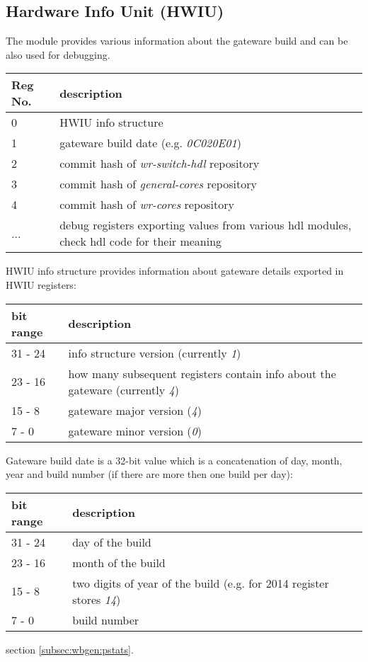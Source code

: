 \subsection{Hardware Info Unit (HWIU)}
\label{sec:hwiu}

The module provides various information about the gateware build and can be also
used for debugging.

\begin{center}
  \begin{tabular}{|p{1.5cm}|p{9cm}|}
    \hline
    Reg No. & description\\
    \hline \hline
    0 & HWIU info structure\\
    1 & gateware build date (e.g. \emph{0C020E01})\\
    2 & commit hash of \emph{wr-switch-hdl} repository\\
    3 & commit hash of \emph{general-cores} repository\\
    4 & commit hash of \emph{wr-cores} repository\\
  ... & debug registers exporting values from various hdl modules, check hdl
    code for their meaning\\
    \hline
  \end{tabular}
\end{center}

HWIU info structure provides information about gateware details exported in HWIU
registers:

\begin{center}
  \begin{tabular}{|p{1.5cm}|p{9cm}|}
    \hline
    bit range & description\\
    \hline \hline
    31 - 24 & info structure version (currently \emph{1})\\
    23 - 16 & how many subsequent registers contain info about the gateware
    (currently \emph{4})\\
    15 -  8 & gateware major version (\emph{4})\\
     7 -  0 & gateware minor version (\emph{0})\\
    \hline
  \end{tabular}
\end{center}

Gateware build date is a 32-bit value which is a concatenation of day, month,
year and build number (if there are more then one build per day):

\begin{center}
  \begin{tabular}{|p{1.5cm}|p{9cm}|}
    \hline
    bit range & description\\
    \hline \hline
    31 - 24 & day of the build\\
    23 - 16 & month of the build\\
    15 -  8 & two digits of year of the build (e.g. for 2014 register stores \emph{14})\\
     7 -  0 & build number\\
    \hline
  \end{tabular}
\end{center}

 section \ref{subsec:wbgen:pstats}.
